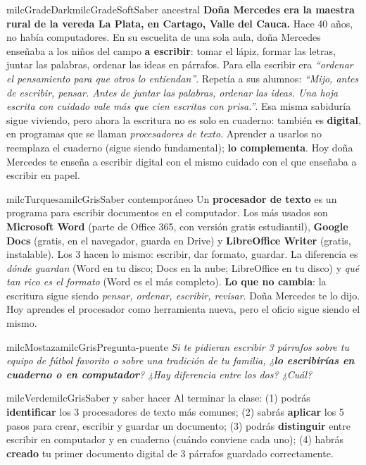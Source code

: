 \documentclass[11pt,letterpaper]{article}
\begin{document}
\begin{softbox}{milcGradeDark}{milcGradeSoft}{Saber ancestral}
\textbf{Doña Mercedes era la maestra rural de la vereda La Plata, en Cartago, Valle del Cauca.} Hace 40 años, no había computadores. En su escuelita de una sola aula, doña Mercedes enseñaba a los niños del campo \textbf{a escribir}: tomar el lápiz, formar las letras, juntar las palabras, ordenar las ideas en párrafos. Para ella escribir era \emph{``ordenar el pensamiento para que otros lo entiendan''}. Repetía a sus alumnos: \emph{``Mijo, antes de escribir, pensar. Antes de juntar las palabras, ordenar las ideas. Una hoja escrita con cuidado vale más que cien escritas con prisa.''}. Esa misma sabiduría sigue viviendo, pero ahora la escritura no es solo en cuaderno: también es \textbf{digital}, en programas que se llaman \emph{procesadores de texto}. Aprender a usarlos no reemplaza el cuaderno (sigue siendo fundamental); \textbf{lo complementa}. Hoy doña Mercedes te enseña a escribir digital con el mismo cuidado con el que enseñaba a escribir en papel.
\end{softbox}

\begin{softbox}{milcTurquesa}{milcGris}{Saber contemporáneo}
Un \textbf{procesador de texto} es un programa para escribir documentos en el computador. Los más usados son \textbf{Microsoft Word} (parte de Office 365, con versión gratis estudiantil), \textbf{Google Docs} (gratis, en el navegador, guarda en Drive) y \textbf{LibreOffice Writer} (gratis, instalable). Los 3 hacen lo mismo: escribir, dar formato, guardar. La diferencia es \emph{dónde guardan} (Word en tu disco; Docs en la nube; LibreOffice en tu disco) y \emph{qué tan rico es el formato} (Word es el más completo). \textbf{Lo que no cambia}: la escritura sigue siendo \emph{pensar, ordenar, escribir, revisar}. Doña Mercedes te lo dijo. Hoy aprendes el procesador como herramienta nueva, pero el oficio sigue siendo el mismo.
\end{softbox}

\begin{softbox}{milcMostaza}{milcGris}{Pregunta-puente}
\textit{Si te pidieran escribir 3 párrafos sobre tu \emph{equipo de fútbol favorito} o sobre \emph{una tradición de tu familia}, ¿\textbf{lo escribirías en cuaderno o en computador}? ¿Hay diferencia entre los dos? ¿Cuál?}
\end{softbox}

\begin{softbox}{milcVerde}{milcGris}{Saber y saber hacer}
Al terminar la clase: (1) podrás \textbf{identificar} los 3 procesadores de texto más comunes; (2) sabrás \textbf{aplicar} los 5 pasos para crear, escribir y guardar un documento; (3) podrás \textbf{distinguir} entre escribir en computador y en cuaderno (cuándo conviene cada uno); (4) habrás \textbf{creado} tu primer documento digital de 3 párrafos guardado correctamente.
\end{softbox}
\end{document}
